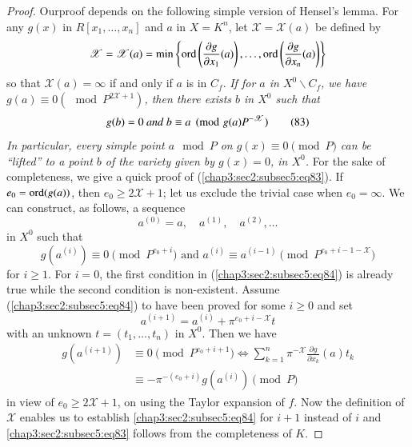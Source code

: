 \begin{proof}
  Our\pageoriginale proof depends on the following simple version of
  Hensel's lemma. For any $g(x)$ in $R[x_{1},\ldots,x_{n}]$ and $a$ in
  $X=K^{n}$, let $\mathscr{X}=\mathscr{X}(a)$ be defined by 
  $$
  \mathscr{X}=\mathscr{X}(a)=\min\left\{\operatorname{ord} \left(\frac{\partial
    g}{\partial x_{1}}(a)\right),\ldots,\operatorname{ord}\left(\frac{\partial
    g}{\partial x_{n}}(a)\right)\right\}
  $$
  so that $\mathscr{X}(a)=\infty$ if and only if $a$ is in $C_{f}$. {\em
    If for $a$ in $X^{0}\backslash C_{f}$, we have $g(a)\equiv 0(\mod
    P^{2\mathscr{X}+1})$, then there exists $b$ in $X^{0}$ such that}
  \begin{equation*}
    g(b)=0\text{ \textit{and} } b\equiv a \pmod{g(a)P^{-\mathscr{X}}}
    \tag{83}\label{chap3:sec2:subsec5:eq83} 
  \end{equation*}
      {\em In particular, every simple point $a\mod P$ on $g(x)\equiv 0\pmod{
        P}$ can be ``lifted'' to a point $b$ of the variety given by
        $g(x)=0$, in $X^{0}$.} For the sake of completeness, we give a quick
      proof of (\ref{chap3:sec2:subsec5:eq83}). If $e_{0}=\operatorname{ord}(g(a))$,
      then $e_{0}\geq 
      2\mathscr{X}+1$; let us exclude the trivial case when
      $e_{0}=\infty$. We can construct, as follows, a sequence
      $$
      a^{(0)}=a,\quad a^{(1)},\quad a^{(2)},\ldots
      $$
      in $X^{0}$ such that
      \begin{equation*}
      g(a^{(i)})\equiv 0\pmod{P^{e_{0}+i}}\text{ and } a^{(i)}\equiv
      a^{(i-1)} {\pmod{P^{e_{0}+i-1-\mathscr{X}}}}
      \tag{84}\label{chap3:sec2:subsec5:eq84} 
      \end{equation*}
      for $i\geq 1$. For $i=0$, the first condition in
      (\ref{chap3:sec2:subsec5:eq84}) is already
      true while the second condition is non-existent. Assume
      (\ref{chap3:sec2:subsec5:eq84}) to 
      have been proved for some $i\geq 0$ and set
      $$
      a^{(i+1)}=a^{(i)}+\pi^{e_{0}+i-\mathscr{X}}t
      $$
      with an unknown $t=(t_{1},\ldots,t_{n})$ in $X^{0}$. Then we have
      \begin{align*}
      g(a^{(i+1)}) & \equiv 0\pmod{P^{e_{0}+i+1}}\Leftrightarrow
      \sum^{n}_{k=1}\pi^{-\mathscr{X}}\frac{\partial g}{\partial
        x_{k}}(a)t_{k}\\
      & \equiv -\pi^{-(e_{0}+i)}g(a^{(i)})\pmod{P}
      \end{align*}
      in view of $e_{0}\geq 2\mathscr{X}+1$, on using the Taylor expansion
      of $f$. Now the definition of $\mathscr{X}$ enables us to establish
      \ref{chap3:sec2:subsec5:eq84} for $i+1$ instead of $i$
      and \ref{chap3:sec2:subsec5:eq83} follows from the
      completeness of $K$.
\end{proof}

